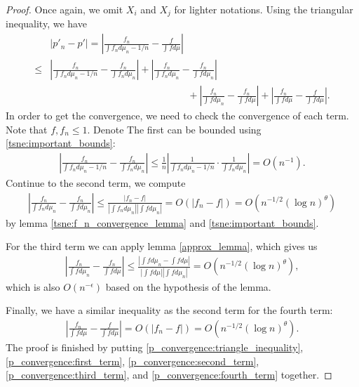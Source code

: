 \begin{proof}

    Once again, we omit $X_i$ and $X_j$ for lighter notations. Using the triangular
    inequality, we have
    \begin{align} \label{p_convergence:triangle_inequality}
             & |p'_n - p'| = \left|\frac{f_n}{\int f_n d\mu_n - 1/n} - \frac{f}{\int f d \mu}\right| \nonumber                                                                                       \\
        \leq & \left|\frac{f_n}{\int f_n d\mu_n - 1/n} - \frac{f_n}{\int f_n d \mu_n}\right| + \left|\frac{f_n}{\int f_n d\mu_n} - \frac{f_n}{\int f d \mu_n}\right| \nonumber                       \\
             & \qquad \qquad \qquad \qquad \qquad \qquad \qquad + \left|\frac{f_n}{\int f d\mu_n} - \frac{f_n}{\int f d \mu}\right| + \left|\frac{f_n}{\int f d\mu} - \frac{f}{\int f d \mu}\right|.
    \end{align}
    In order to get the convergence, we need to check the convergence of each term. Note that $f,f_n \leq 1$. Denote
    The first can be bounded using \eqref{tsne:important_bounds}:
    \begin{align} \label{p_convergence:first_term}
        \left|\frac{f_n}{\int f_n d\mu_n - 1/n} - \frac{f_n}{\int f_n d \mu_n}\right| \leq \frac{1}{n} \left|\frac{1}{\int f_n d\mu_n - 1/n} \cdot \frac{1}{\int f_n d\mu_n}\right|= O(n^{-1}).
    \end{align}
    Continue to the second term, we compute
    \begin{align} \label{p_convergence:second_term}
        \left|\frac{f_n}{\int f_n d\mu_n} - \frac{f_n}{\int f d \mu_n}\right| \leq \frac{|f_n-f|}{|\int f_n d\mu_n||\int f d\mu_n|} = O(|f_n-f|) = O(n^{-1/2} (\log n)^{\theta})
    \end{align}
    by lemma \ref{tsne:f_n_convergence_lemma} and \eqref{tsne:important_bounds}.

    For the third term we can apply lemma \ref{approx_lemma}, which gives us
    \begin{align} \label{p_convergence:third_term}
        \left|\frac{f_n}{\int f d\mu_n} - \frac{f_n}{\int f d \mu}\right| \leq \frac{|\int f d \mu_n - \int f d \mu|}{|\int f d \mu||\int f d \mu_n|} = O(n^{-1/2} (\log n)^{\theta}),
    \end{align}
    which is also $O(n^{-\epsilon})$ based on the hypothesis of the lemma.

    Finally, we have a similar inequality as the second term for the fourth term:
    \begin{align} \label{p_convergence:fourth_term}
        \left|\frac{f_n}{\int f d\mu} - \frac{f}{\int f d \mu}\right| = O(|f_n-f|) = O(n^{-1/2} (\log n)^{\theta}).
    \end{align}
    The proof is finished by putting \eqref{p_convergence:triangle_inequality}, \eqref{p_convergence:first_term}, \eqref{p_convergence:second_term}, \eqref{p_convergence:third_term}, and \eqref{p_convergence:fourth_term} together.
\end{proof}
